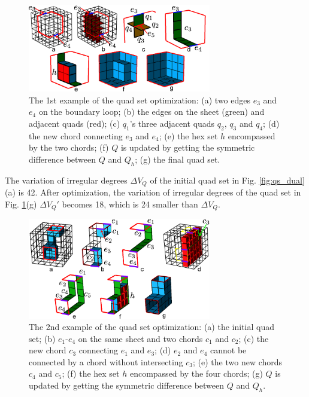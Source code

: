 \documentclass[final,5p,times,twocolumn]{elsarticle}
\begin{document}
\begin{figure}[htbp]
\begin{center}
\includegraphics[width=8cm]{figures/qs_opt1.png}
\caption{The 1st example of the quad set optimization: (a) two edges $e_3$ and $e_4$ on the boundary loop; (b) the edges on the sheet (green) and adjacent quads (red); (c) $q_1$'s three adjacent quads $q_2$, $q_3$ and $q_4$; (d) the new chord connecting $e_3$ and $e_4$; (e) the hex set $h$ encompassed by the two chords; (f) $Q$ is updated by getting the symmetric difference between $Q$ and $Q_h$; (g) the final quad set.}
\label{fig:qs_opt1}
\end{center}
\end{figure}

The variation of irregular degrees $\Delta V_Q$ of the initial quad set in Fig. \ref{fig:qs_dual}(a) is 42. After optimization, the variation of irregular degrees of the quad set in Fig. \ref{fig:qs_opt1}(g) $\Delta V_Q'$ becomes 18, which is 24 smaller than $\Delta V_Q$.

\begin{figure}[htbp]
\begin{center}
\includegraphics[width=8cm]{figures/qs_opt2.png}
\caption{The 2nd example of the quad set optimization: (a) the initial quad set; (b) $e_1$-$e_4$ on the same sheet and two chords $c_1$ and $c_2$; (c) the new chord $c_3$ connecting $e_1$ and $e_3$; (d) $e_2$ and $e_4$ cannot be connected by a chord without intersecting $c_3$; (e) the two new chords $c_4$ and $c_5$; (f) the hex set $h$ encompassed by the four chords; (g) $Q$ is updated by getting the symmetric difference between $Q$ and $Q_h$.}
\label{fig:qs_opt2}
\end{center}
\end{figure}
\end{document}
